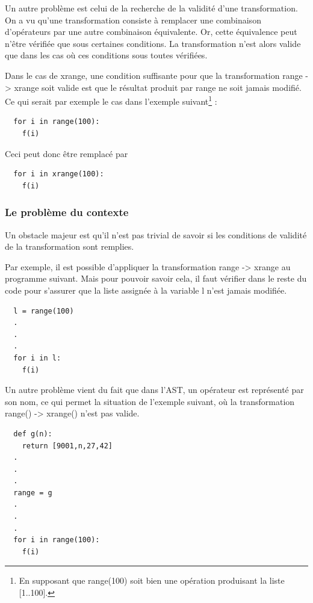 \documentclass[a4paper]{article}
\begin{document}
Un autre problème est celui de la recherche de la validité d'une transformation. On a vu qu'une transformation consiste à remplacer une combinaison d'opérateurs par une autre combinaison équivalente. Or, cette équivalence peut n'être vérifiée que sous certaines conditions. La transformation n'est alors valide que dans les cas où ces conditions sous toutes vérifiées.

Dans le cas de xrange, une condition suffisante pour que la transformation range -> xrange soit valide est que le résultat produit par range ne soit jamais modifié. Ce qui serait par exemple le cas dans l'exemple suivant\footnote{En supposant que range(100) soit bien une opération produisant la liste [1..100].} :

\begin{verbatim}
  for i in range(100):
    f(i)
\end{verbatim}

Ceci peut donc être remplacé par

\begin{verbatim}
  for i in xrange(100):
    f(i)
\end{verbatim}

\subsubsection{Le problème du contexte}

Un obstacle majeur est qu'il n'est pas trivial de savoir si les conditions de validité de la transformation sont remplies.

Par exemple, il est possible d'appliquer la transformation range -> xrange au programme suivant. Mais pour pouvoir savoir cela, il faut vérifier dans le reste du code pour s'assurer que la liste assignée à la variable l n'est jamais modifiée.

\begin{verbatim}
  l = range(100)
  .
  .
  .
  for i in l:
    f(i)
\end{verbatim}

Un autre problème vient du fait que dans l'AST, un opérateur est représenté par son nom, ce qui permet la situation de l'exemple suivant, où la transformation range() -> xrange() n'est pas valide.

\begin{verbatim}
  def g(n):
    return [9001,n,27,42]
  .
  .
  .
  range = g
  .
  .
  .
  for i in range(100):
    f(i)
\end{verbatim}
\end{document}
